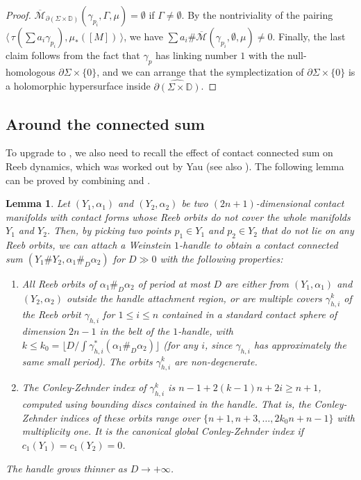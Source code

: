 \documentclass[11pt]{amsart}
\numberwithin{equation}{section}
\newtheorem{lemma}[theorem]{\textbf{Lemma}}
\def\D{{\mathbb D}}
\def\cM{{\mathcal M}}
\def\la{\langle\,}
\def\ra{\,\rangle}
\begin{document}
\begin{proof}
$\overline{\cM}_{\partial(\Sigma \times \D)}(\gamma_{p_i},\Gamma,\mu)=\emptyset$ if $\Gamma \ne \emptyset$. By the nontriviality of the pairing $\la \tau(\sum a_i \gamma_{p_i}),\mu_*([M]) \ra$, we have $\sum a_i\# \overline{\cM}(\gamma_{p_i},\emptyset,\mu)\ne 0$. Finally, the last claim follows from the fact that $\gamma_p$ has linking number $1$ with the null-homologous $\partial \Sigma \times \{0\}$, and we can arrange that the symplectization of $\partial \Sigma \times \{0\}$ is a holomorphic hypersurface inside $\widehat{\partial(\Sigma \times \D)}$.   
\end{proof}

\subsection{Around the connected sum}
To upgrade  to , we also need to recall the effect of contact connected sum on Reeb dynamics, which was worked out by Yau \cite{Yau} (see also \cite{Lazarev}). The following lemma can be proved by combining \cite[\S 4]{Yau} and \cite[Proof of Proposition 4.4]{Lazarev}. 
\begin{lemma}\label{lemma:connected_sum}
    Let $(Y_1,\alpha_1)$ and $(Y_2,\alpha_2)$ be two $(2n+1)$-dimensional contact manifolds with contact forms whose Reeb orbits do not cover the whole manifolds $Y_1$ and $Y_2$. Then, by picking two points $p_1\in Y_1$ and $p_2\in Y_2$ that do not lie on any Reeb orbits, we can attach a Weinstein $1$-handle to obtain a contact connected sum $(Y_1\#Y_2,\alpha_1\#_D\alpha_2)$ for $D\gg 0$ with the following properties:
    \begin{enumerate}
        \item All Reeb orbits of $\alpha_1 \#_D \alpha_2$ of period at most $D$ are either from $(Y_1,\alpha_1)$ and $(Y_2,\alpha_2)$ outside the handle attachment region, or are multiple covers $\gamma_{h,i}^k$ of the Reeb orbit $\gamma_{h,i}$ for $1\le i \le n$ contained in a standard contact sphere of dimension $2n-1$ in the belt of the $1$-handle, with $k\le k_0=\lfloor D/ \int \gamma_{h,i}^*(\alpha_1\#_D\alpha_2) \rfloor$ (for any $i$, since $\gamma_{h,i}$ has approximately the same small period). The orbits $\gamma^k_{h,i}$ are non-degenerate.
        \item The Conley-Zehnder index of $\gamma_{h,i}^k$ is $n-1+2(k-1)n+2i \ge n+1$, computed using bounding discs contained in the handle. That is, the Conley-Zehnder indices of these orbits range over $\{n+1,n+3, \ldots, 2k_0n+n-1\}$ with multiplicity one. It is the canonical global Conley-Zehnder index if $c_1(Y_1)=c_1(Y_2)=0$.
    \end{enumerate}
    The handle grows thinner as $D\to +\infty$.
\end{lemma}
\end{document}
